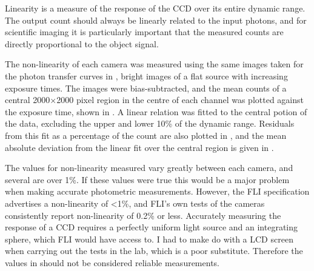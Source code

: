 \begin{colsection}
\begin{colsection}
Linearity is a measure of the response of the CCD over its entire dynamic range. The output count should always be linearly related to the input photons, and for scientific imaging it is particularly important that the measured counts are directly proportional to the object signal.

The non-linearity of each camera was measured using the same images taken for the photon transfer curves in , bright images of a flat source with increasing exposure times. The images were bias-subtracted, and the mean counts of a central 2000$\times$2000 pixel region in the centre of each channel was plotted against the exposure time, shown in . A linear relation was fitted to the central potion of the data, excluding the upper and lower 10\% of the dynamic range. Residuals from this fit as a percentage of the count are also plotted in , and the mean absolute deviation from the linear fit over the central region is given in .

The values for non-linearity measured vary greatly between each camera, and several are over 1\%. If these values were true this would be a major problem when making accurate photometric measurements. However, the FLI specification advertises a non-linearity of <1\%, and FLI's own tests of the cameras consistently report non-linearity of 0.2\% or less. Accurately measuring the response of a CCD requires a perfectly uniform light source and an integrating sphere, which FLI would have access to. I had to make do with a LCD screen when carrying out the tests in the lab, which is a poor substitute. Therefore the values in  should not be considered reliable measurements.


\end{colsection}
\end{colsection}
